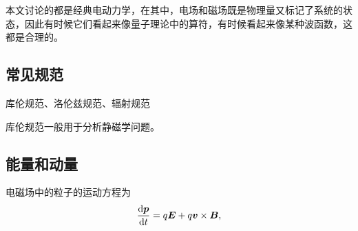 \documentclass[UTF8, a4paper]{ctexart}
\begin{document}
本文讨论的都是经典电动力学，在其中，电场和磁场既是物理量又标记了系统的状态，因此有时候它们看起来像量子理论中的算符，有时候看起来像某种波函数，这都是合理的。

\subsection{常见规范}

库伦规范、洛伦兹规范、辐射规范

库伦规范一般用于分析静磁学问题。

\subsection{能量和动量}

电磁场中的粒子的运动方程为
\begin{equation}
    \dv{\vb*{p}}{t} = q \vb*{E} + q \vb*{v} \times \vb*{B},
\end{equation}
\end{document}
